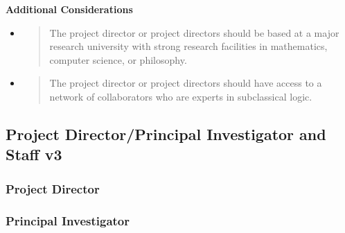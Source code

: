 \textbf{Additional Considerations}

\begin{itemize}
\item
  \begin{quote}
  The project director or project directors should be based at a major
  research university with strong research facilities in mathematics,
  computer science, or philosophy.
  \end{quote}
\item
  \begin{quote}
  The project director or project directors should have access to a
  network of collaborators who are experts in subclassical logic.
  \end{quote}
\end{itemize}

\hypertarget{project-directorprincipal-investigator-and-staff-v3}{%
\subsection{Project Director/Principal Investigator and Staff
v3}\label{project-directorprincipal-investigator-and-staff-v3}}

\hypertarget{project-director}{%
\subsubsection{Project Director}\label{project-director}}

\hypertarget{principal-investigator-1}{%
\subsubsection{Principal Investigator}\label{principal-investigator-1}}

